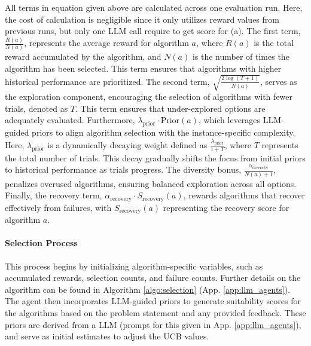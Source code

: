 All terms in equation given above are calculated across one evaluation run. Here, the cost of calculation is negligible since it only utilizes reward values from previous runs, but only one LLM call require to get score for (a). The first term, \(\frac{R(a)}{N(a)}\), represents the average reward for algorithm \(a\), where \(R(a)\) is the total reward accumulated by the algorithm, and \(N(a)\) is the number of times the algorithm has been selected. This term ensures that algorithms with higher historical performance are prioritized. The second term, \(\sqrt{\frac{2 \log(T + 1)}{N(a)}}\), serves as the exploration component, encouraging the selection of algorithms with fewer trials, denoted as $T$. This term ensures that under-explored options are adequately evaluated. Furthermore, \(\lambda_{\text{prior}} \cdot \text{Prior}(a)\), which leverages LLM-guided priors to align algorithm selection with the instance-specific complexity. Here, \(\lambda_{\text{prior}}\) is a dynamically decaying weight defined as \(\frac{\lambda_{\text{prior}}}{1 + T}\), where \(T\) represents the total number of trials. This decay gradually shifts the focus from initial priors to historical performance as trials progress. The diversity bonus, \(\frac{\alpha_{\text{diversity}}}{N(a) + 1}\), penalizes overused algorithms, ensuring balanced exploration across all options. Finally, the recovery term, \(\alpha_{\text{recovery}} \cdot S_{\text{recovery}}(a)\), rewards algorithms that recover effectively from failures, with \(S_{\text{recovery}}(a)\) representing the recovery score for algorithm \(a\).

\paragraph{Selection Process}
This process begins by initializing algorithm-specific variables, such as accumulated rewards, selection counts, and failure counts. Further details on the algorithm can be found in Algorithm \ref{algo:selection} (App. \ref{app:llm_agents}). The agent then incorporates LLM-guided priors to generate suitability scores for the algorithms based on the problem statement and any provided feedback. These priors are derived from a LLM (prompt for this given in App. \ref{app:llm_agents}), and serve as initial estimates to adjust the UCB \citep{han2024ucb} values.


